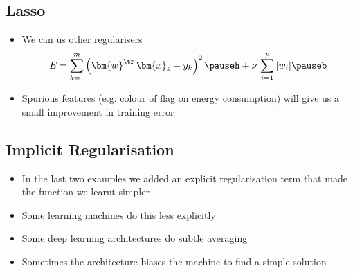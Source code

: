 
\begin{slide}
\section[-2.5]{Lasso}

\pb
\begin{itemize}\squeeze
\item We can us other regularisers
  \begin{align*}
    E = \sum_{k=1}^m \left( \bm{w}^\tr \, \bm{x}_k - y_k \right)^2\pauseh
    + \nu \, \sum_{i=1}^p |w_i| \pauseb
  \end{align*}
\item Spurious features (e.g. colour of flag on energy consumption) will
  give us a small improvement in training error\pauseh
  \begin{center}
    \pause
  \end{center}
\end{itemize}


\end{slide}


\begin{slide}
\section{Implicit Regularisation}

\begin{PauseHighLight}
  \begin{itemize}
  \item In the last two examples we added an explicit regularisation
    term that made the function we learnt simpler\pause
  \item Some learning machines do this less explicitly\pause
  \item Some deep learning architectures do subtle averaging\pause
  \item Sometimes the architecture biases the machine to find a simple
    solution\pause
  \end{itemize}
\end{PauseHighLight}

\end{slide}


